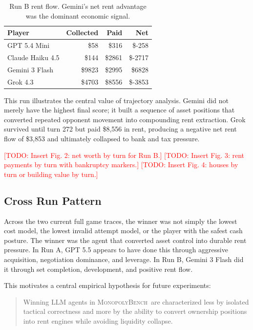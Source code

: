 \documentclass[conference]{IEEEtran}
\newcommand{\Bench}{\textsc{MonopolyBench}}
\newcommand{\todo}[1]{\textcolor{red}{[TODO: #1]}}
\begin{document}
\begin{table}[t]
\caption{Run B rent flow. Gemini's net rent advantage was the dominant economic signal.}
\label{tab:run_b_rent}
\centering
\begin{tabular}{lrrr}
\toprule
\textbf{Player} & \textbf{Collected} & \textbf{Paid} & \textbf{Net} \\
\midrule
GPT 5.4 Mini & \$58 & \$316 & \$-258 \\
Claude Haiku 4.5 & \$144 & \$2861 & \$-2717 \\
Gemini 3 Flash & \$9823 & \$2995 & \$6828 \\
Grok 4.3 & \$4703 & \$8556 & \$-3853 \\
\bottomrule
\end{tabular}
\end{table}

This run illustrates the central value of trajectory analysis. Gemini did not merely have the highest final score; it built a sequence of asset positions that converted repeated opponent movement into compounding rent extraction. Grok survived until turn 272 but paid \$8,556 in rent, producing a negative net rent flow of \$3,853 and ultimately collapsed to bank and tax pressure.

\todo{Insert Fig. 2: net worth by turn for Run B.}
\todo{Insert Fig. 3: rent payments by turn with bankruptcy markers.}
\todo{Insert Fig. 4: houses by turn or building value by turn.}

\subsection{Cross Run Pattern}

Across the two current full game traces, the winner was not simply the lowest cost model, the lowest invalid attempt model, or the player with the safest cash posture. The winner was the agent that converted asset control into durable rent pressure. In Run A, GPT 5.5 appears to have done this through aggressive acquisition, negotiation dominance, and leverage. In Run B, Gemini 3 Flash did it through set completion, development, and positive rent flow.

This motivates a central empirical hypothesis for future experiments:

\begin{quote}
Winning LLM agents in \Bench\ are characterized less by isolated tactical correctness and more by the ability to convert ownership positions into rent engines while avoiding liquidity collapse.
\end{quote}
\end{document}
